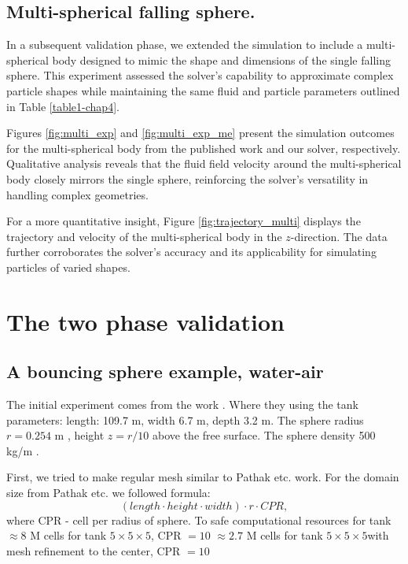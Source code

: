 \subsection{Multi-spherical falling sphere.}

In a subsequent validation phase, we extended the simulation to include a multi-spherical body designed to mimic the shape and dimensions of the single falling sphere. This experiment assessed the solver's capability to approximate complex particle shapes while maintaining the same fluid and particle parameters outlined in Table \ref{table1-chap4}.

Figures \ref{fig:multi_exp} and \ref{fig:multi_exp_me} present the simulation outcomes for the multi-spherical body from the published work and our solver, respectively. Qualitative analysis reveals that the fluid field velocity around the multi-spherical body closely mirrors the single sphere, reinforcing the solver's versatility in handling complex geometries.

For a more quantitative insight, Figure \ref{fig:trajectory_multi} displays the trajectory and velocity of the multi-spherical body in the $z$-direction. The data further corroborates the solver's accuracy and its applicability for simulating particles of varied shapes.

\section{The two phase validation} \label{ch-3}
\subsection{A bouncing sphere example, water-air}
The initial experiment comes from the work \cite{beck1987transient}. Where they using the tank parameters: length: 109.7 m, width 6.7 m, depth 3.2 m. The sphere radius $r= 0.254$ m , height $z = r/10$ above the free surface. The sphere density 500 kg/m .

First, we tried to make regular mesh similar to Pathak etc.\cite{pathak20163d} work. For the domain size from Pathak etc.\cite{pathak20163d} we followed formula:
\begin{equation}
    (length \cdot height \cdot width)  \cdot  r  \cdot  CPR,
\end{equation}
where CPR - cell per radius of sphere. To safe computational resources for tank %
 $\approx 8$ M cells for tank $5\times 5 \times 5$, CPR $= 10$
 $\approx 2.7$ M cells for tank $5\times 5 \times 5$with mesh refinement to the center, CPR $= 10$

